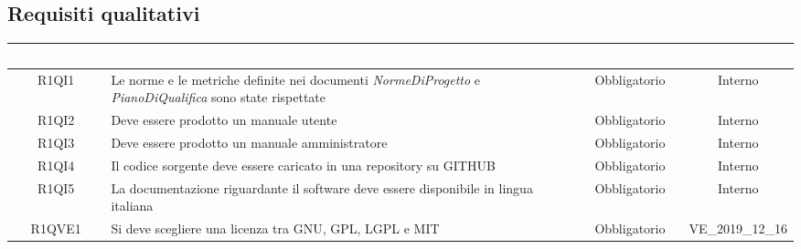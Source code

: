 \subsection{Requisiti qualitativi}
{
\renewcommand{\arraystretch}{1.5}
\centering
\begin{longtable}{ c C{8cm} c c}
\textcolor{white}{\textbf{Identificativo}} & \textcolor{white}{\textbf{Descrizione}} & \textcolor{white}{\textbf{Classificazione}} & \textcolor{white}{\textbf{Fonti}}\\	
\endhead

R1QI1 & Le norme e le metriche definite nei documenti \textit{NormeDiProgetto} e \textit{PianoDiQualifica} sono state rispettate & Obbligatorio & Interno\\

R1QI2 & Deve essere prodotto un manuale utente & Obbligatorio & Interno\\

R1QI3 & Deve essere prodotto un manuale amministratore & Obbligatorio & Interno\\

R1QI4 & Il codice sorgente deve essere caricato in una repository su GITHUB & Obbligatorio & Interno\\

R1QI5 & La documentazione riguardante il software deve essere disponibile in lingua italiana & Obbligatorio & Interno\\

R1QVE1 & Si deve scegliere una licenza tra GNU, GPL, LGPL e MIT& Obbligatorio & VE\_2019\_12\_16 \\

\end{longtable}
}